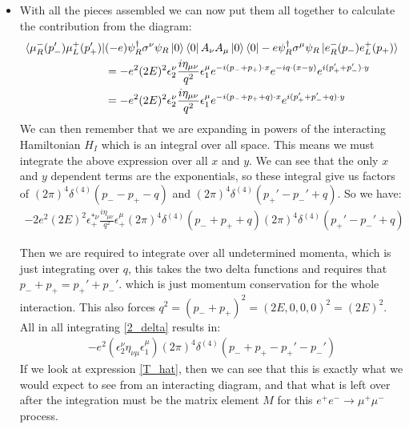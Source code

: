 \documentclass[11pt]{article}
\numberwithin{equation}{section}
\begin{document}
\begin{itemize}
     \item With all the pieces assembled we can now put them all together to calculate the contribution from the diagram:
     \begin{align*}
           \bra{\mu_R^{-}(p_-')\mu_L^{+}(p_+')}&(- e)\psi^{\dagger}_R\sigma^{\nu}\psi_R \ket{0}\bra{0} A_{\nu} A_{\mu}\ket{0}\bra{0}- e\psi^{\dagger}_R\sigma^{\mu}\psi_R\ket{e_R^{-}(p_-)e_L^{+}(p_+)} \\
           & = -e^2(2E)^2\epsilon_2^{\nu}\frac{i\eta_{\mu\nu}}{q^2}\epsilon^{\mu}_1e^{-i(p_-+p_+)\cdot x}e^{-iq \cdot (x - y)}e^{i(p_+'+p_-')\cdot y} \\
            & = -e^2(2E)^2\epsilon_2^{\nu}\frac{i\eta_{\mu\nu}}{q^2}\epsilon^{\mu}_1e^{-i(p_-+p_++q)\cdot x}e^{i(p_+'+p_-'+q)\cdot y}
     \end{align*}
     We can then remember that we are expanding in powers of the interacting Hamiltonian $H_I$ which is an integral over all space. This means we must integrate the above expression over all $x$ and $y$. We can see that the only $x$ and $y$ dependent terms are the exponentials, so these integral give us factors of $(2\pi)^4\delta^{(4)}(p_--p_+ -q)$ and $(2\pi)^4\delta^{(4)}(p_+'-p_-' +q)$. So we have:
     \begin{align}
     \label{2_delta}
         -2e^2(2E)^2\epsilon^{\ast\nu}_+\frac{i\eta_{\mu\nu}}{q^2}\epsilon^{\mu}_+(2\pi)^4\delta^{(4)}(p_-+p_+ +q)(2\pi)^4\delta^{(4)}(p_+'-p_-'+q)
     \end{align}

     Then we are required to integrate over all undetermined momenta, which is just integrating over $q$, this takes the two delta functions and requires that $p_-+p_+ = p_+'+p_-'$. which is just momentum conservation for the whole interaction. This also forces $q^2 = (p_-+p_+)^2 = (2E,0,0,0)^2 = (2E)^2$. All in all integrating \ref{2_delta} results in:
     \begin{align*}
          -e^2(\epsilon_2^{\nu}\eta_{\nu\mu}\epsilon_{1}^{\mu})(2\pi)^4\delta^{(4)}(p_-+p_+-p_+'-p_-')
     \end{align*}
      If we look at expression \ref{T_hat}, then we can see that this is exactly what we would expect to see from an interacting diagram, and that what is left over after the integration must be the matrix element $M$ for this $e^+e^- \rightarrow \mu^+\mu^-$ process. 


\end{itemize}
\end{document}
